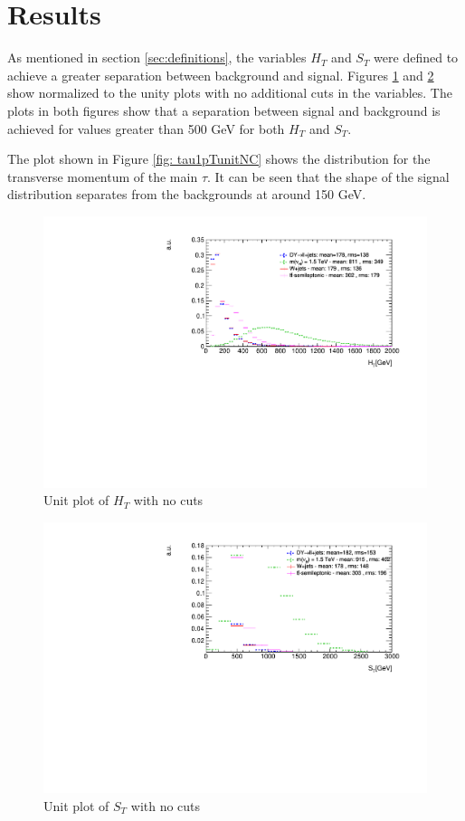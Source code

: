 \section{Results} \label{sec:results}

As mentioned in section \ref{sec:definitions}, the variables $H_{T}$ and $S_{T}$ were defined to achieve a greater separation between background and signal. Figures \ref{fig: HTunitNC} and \ref{fig: STunitNC} show normalized to the unity plots with no additional cuts in the variables. The plots in both figures show that a separation between signal and background is achieved for values greater than 500 GeV for both $H_{T}$ and $S_{T}$.

The plot shown in Figure \ref{fig: tau1pTunitNC} shows the distribution for the transverse momentum of the main $\tau$. It can be seen that the shape of the signal distribution separates from the backgrounds at around 150 GeV.

\begin{figure}
\centering
\includegraphics[width=1.2\linewidth]{Figures/Plots/HT_unitNoCuts}
\caption{Unit plot of $H_{T}$ with no cuts}
\label{fig: HTunitNC}
\end{figure}

\begin{figure}
\centering
\includegraphics[width=1.2\linewidth]{Figures/Plots/ST_unitNoCuts}
\caption{Unit plot of $S_{T}$ with no cuts}
\label{fig: STunitNC}
\end{figure}


